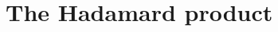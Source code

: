 \documentclass[11pt, lettersize, notitlepage, leqno, footskip=0.6cm]{article}
\newcommand{\wti}{\widetilde}
\newcommand{\mc}{\mathcal}
\newcommand{\mbf}{\mathbf}
\newcommand{\mr}{\mathrm}
\newcommand{\be}{\beta}
\newcommand{\what}{\widehat}
\newcommand{\mP}{\mc{P}}
\newcommand{\V}{\mc{V}}
\newcommand{\vs}{\vspace{-0.15cm}}
\newcommand{\sta}{\stackrel{?}{=}}
\newcommand{\e}{\mbf{e}}
\numberwithin{equation}{section}
\begin{document}
\begin{comment}



\item $\mP$ computes $$ f_{_{\prod,\gamma}} (X)  :=   f(\gamma \cdot X)\cdot \Big[\frac{X^{\deg(f)+1}-1}{X-1} -  f^{\mr{Rev}}(X) \Big] $$ and sends the commitment \vs $$a_{_{\prod,\gamma}} := g_1^{f_{_{\prod,\gamma}}(s)}  $$ along with a proof of $\hyperlink{Prod}{\tt{ZKPoProd}}[g_1,\;(a,\;(a^{\vee})^{-1}\cdot \what{g}_1 ),\; a_{_{\prod,\gamma}}]$


\item $\mP$ sends a proof of $\hyperlink{Coeff}{\tt{ZKPoCoef}}[g_1,\;(a_{_{\prod,\gamma}}, a_{\deg}, 1)]$

\item $\V$ verifies the $\hyperlink{Deg}{\tt{ZKPoDeg}}$, the $\hyperlink{DegMono}{\tt{ZKPoDegMono}}$, the $\hyperlink{Rev}{\tt{ZKPoRev}}$, the $\hyperlink{Const}{\tt{ZKPoConst}}$, the $\hyperlink{Coeff}{\tt{ZKPoCoef}}$, the $\hyperlink{Prod}{\tt{ZKPoProd}}$ and the $\hyperlink{Twist}{\tt{ZKPoTwist}}$.


\end{enumerate}

\end{mdframed}










\bigskip



\end{comment}

\section{\fontsize{11}{11}\selectfont The Hadamard product}
\end{document}
